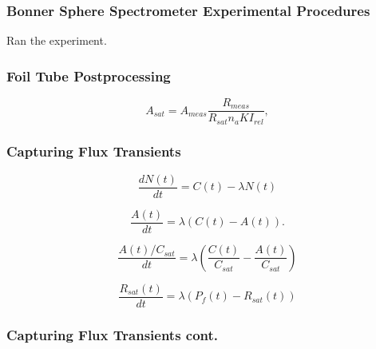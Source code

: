 \documentclass[fleqn]{beamer}
\begin{document}
\begin{frame}
\frametitle{Bonner Sphere Spectrometer Experimental Procedures}

Ran the experiment.

\end{frame}

\begin{frame}
\frametitle{Foil Tube Postprocessing}

\begin{equation}
\label{eqn:a_sat}
A_{sat} = A_{meas} \frac{R_{meas}}{R_{sat} n_a K I_{rel}} ,
\end{equation}

\end{frame}

\begin{frame}
\frametitle{Capturing Flux Transients}

\begin{equation}
\label{eqn:bateman}
\frac{dN(t)}{dt} = C(t) - \lambda N(t)
\end{equation}

\begin{equation}
\label{eqn:bateman_activity}
\frac{A(t)}{dt} = \lambda (C(t) - A(t)).
\end{equation}

\begin{equation}
\label{eqn:bateman_ratios}
\frac{A(t) / C_{sat}}{dt} = \lambda (\frac{C(t)}{C_{sat}} - \frac{A(t)}{C_{sat}})
\end{equation}

\begin{equation}
\label{eqn:bateman_r_sat}
\frac{R_{sat}(t)}{dt} = \lambda (P_{f}(t) - R_{sat}(t))
\end{equation}

\end{frame}

\begin{frame}
\frametitle{Capturing Flux Transients cont.}

\end{frame}
\end{document}
